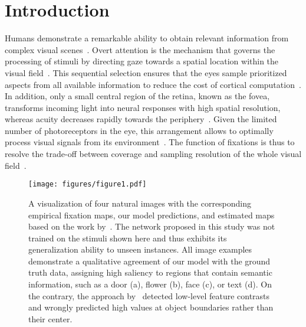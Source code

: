 \documentclass[final,1p,times,number]{elsarticle}
\begin{document}
\section{Introduction}
Humans demonstrate a remarkable ability to obtain relevant information from complex visual scenes~\cite{jonides1982integrating,irwin1991information}. Overt attention is the mechanism that governs the processing of stimuli by directing gaze towards a spatial location within the visual field~\cite{posner1980orienting}. This sequential selection ensures that the eyes sample prioritized aspects from all available information to reduce the cost of cortical computation~\cite{lennie2003cost}. In addition, only a small central region of the retina, known as the fovea, transforms incoming light into neural responses with high spatial resolution, whereas acuity decreases rapidly towards the periphery~\cite{cowey1974human,berkley1975grating}. Given the limited number of photoreceptors in the eye, this arrangement allows to optimally process visual signals from its environment~\cite{cheung2016emergence}. The function of fixations is thus to resolve the trade-off between coverage and sampling resolution of the whole visual field~\cite{gegenfurtner2016interaction}.

\begin{figure}[t!]
\centering\texttt{[image: figures/figure1.pdf]}
\caption{A visualization of four natural images with the corresponding empirical fixation maps, our model predictions, and estimated maps based on the work by~\citet{itti1998model}. The network proposed in this study was not trained on the stimuli shown here and thus exhibits its generalization ability to unseen instances. All image examples demonstrate a qualitative agreement of our model with the ground truth data, assigning high saliency to regions that contain semantic information, such as a door (a), flower (b), face (c), or text (d). On the contrary, the approach by~\citet{itti1998model} detected low-level feature contrasts and wrongly predicted high values at object boundaries rather than their center.}
\label{fig:fig1}
\end{figure}
\end{document}
